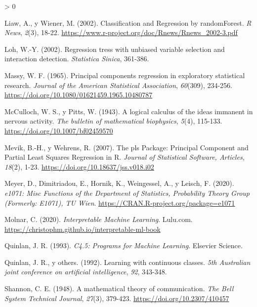\documentclass[
  spanish,
]{book}
\theoremstyle{break}
\newlength{\cslhangindent}
\newenvironment{CSLReferences}[2] %
 {%
  \setlength{\parindent}{0pt}
  \ifodd #1 \everypar{\setlength{\hangindent}{\cslhangindent}}\ignorespaces\fi
  \ifnum #2 > 0
  \setlength{\parskip}{#2\baselineskip}
  \fi
 }%
 {}
\theoremstyle{definition}
\theoremstyle{definition}
\theoremstyle{definition}
\theoremstyle{definition}
\theoremstyle{remark}
\begin{document}
\begin{CSLReferences}{1}{0}
\leavevmode\hypertarget{ref-liaw2002classification}{}%
Liaw, A., y Wiener, M. (2002). Classification and Regression by {randomForest}. \emph{R News}, \emph{2}(3), 18-22. \url{https://www.r-project.org/doc/Rnews/Rnews_2002-3.pdf}

\leavevmode\hypertarget{ref-loh2002regression}{}%
Loh, W.-Y. (2002). Regression tress with unbiased variable selection and interaction detection. \emph{Statistica Sinica}, 361-386.

\leavevmode\hypertarget{ref-massy1965principal}{}%
Massy, W. F. (1965). Principal components regression in exploratory statistical research. \emph{Journal of the American Statistical Association}, \emph{60}(309), 234-256. \url{https://doi.org/10.1080/01621459.1965.10480787}

\leavevmode\hypertarget{ref-mcculloch1943logical}{}%
McCulloch, W. S., y Pitts, W. (1943). A logical calculus of the ideas immanent in nervous activity. \emph{The bulletin of mathematical biophysics}, \emph{5}(4), 115-133. \url{https://doi.org/10.1007/bf02459570}

\leavevmode\hypertarget{ref-Mevik2007pls}{}%
Mevik, B.-H., y Wehrens, R. (2007). The pls Package: Principal Component and Partial Least Squares Regression in R. \emph{Journal of Statistical Software, Articles}, \emph{18}(2), 1-23. \url{https://doi.org/10.18637/jss.v018.i02}

\leavevmode\hypertarget{ref-R-e1071}{}%
Meyer, D., Dimitriadou, E., Hornik, K., Weingessel, A., y Leisch, F. (2020). \emph{e1071: Misc Functions of the Department of Statistics, Probability Theory Group (Formerly: E1071), TU Wien}. \url{https://CRAN.R-project.org/package=e1071}

\leavevmode\hypertarget{ref-molnar2020interpretable}{}%
Molnar, C. (2020). \emph{Interpretable Machine Learning}. Lulu.com. \url{https://christophm.github.io/interpretable-ml-book}

\leavevmode\hypertarget{ref-quinlan1993c4}{}%
Quinlan, J. R. (1993). \emph{C4.5: Programs for Machine Learning}. Elsevier Science.

\leavevmode\hypertarget{ref-quinlan1992learning}{}%
Quinlan, J. R., y others. (1992). Learning with continuous classes. \emph{5th Australian joint conference on artificial intelligence}, \emph{92}, 343-348.

\leavevmode\hypertarget{ref-shannon1948mathematical}{}%
Shannon, C. E. (1948). A mathematical theory of communication. \emph{The Bell System Technical Journal}, \emph{27}(3), 379-423. \url{https://doi.org/10.2307/410457}


\end{CSLReferences}
\end{document}
